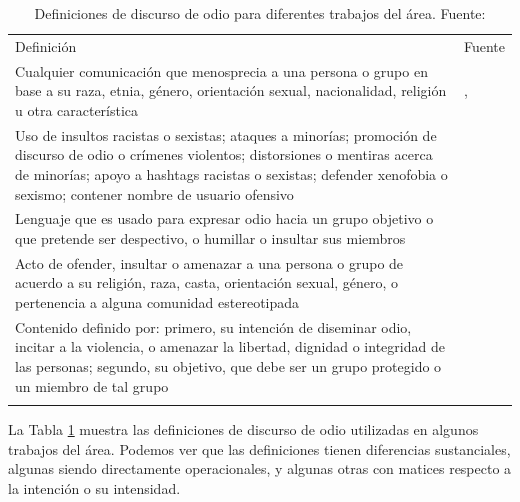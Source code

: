 \begin{table}
    \centering
    \small
    \begin{tabular}{p{} p{}}
        Definición & Fuente \\
        \Xhline{2\arrayrulewidth}
        Cualquier comunicación que menosprecia a una persona o grupo en base a su raza, etnia, género, orientación sexual, nacionalidad, religión u otra característica & \citet{warner2012detecting}, \citet{hateval2019semeval} \\
        \hline
        Uso de insultos racistas o sexistas; ataques a minorías; promoción de discurso de odio o crímenes violentos; distorsiones o mentiras acerca de minorías; apoyo a hashtags racistas o sexistas; defender xenofobia o sexismo; contener nombre de usuario ofensivo & \citet{waseem2016hateful} \\
        \hline
        Lenguaje que es usado para expresar odio hacia un grupo objetivo o que pretende ser despectivo, o humillar o insultar sus miembros & \citet{Davidson2017AutomatedHS} \\
        \hline
        Acto de ofender, insultar o amenazar a una persona o grupo de acuerdo a su religión, raza, casta, orientación sexual, género, o pertenencia a alguna comunidad estereotipada & \citet{schmidt2017survey} \\
        \hline
        Contenido definido por: primero, su intención de diseminar odio, incitar a la violencia, o amenazar la libertad, dignidad o integridad de las personas; segundo, su objetivo, que debe ser un grupo protegido o un miembro de tal grupo & \citet{sanguinetti2018italian} \\
        \Xhline{2\arrayrulewidth}
    \end{tabular}
    \caption{Definiciones de discurso de odio para diferentes trabajos del área. Fuente: \citet{poletto2021resources}}
    \label{tab:hate_speech_definitions}
\end{table}

La Tabla \ref{tab:hate_speech_definitions} muestra las definiciones de discurso de odio utilizadas en algunos trabajos del área. Podemos ver que las definiciones tienen diferencias sustanciales,  algunas siendo directamente operacionales, y algunas otras con matices respecto a la intención o su intensidad.